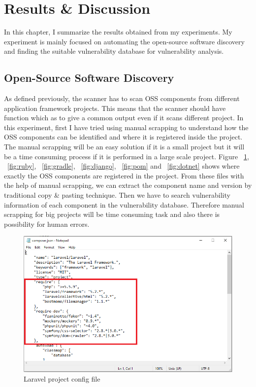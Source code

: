 %
\section{Results \& Discussion}\label{sec:Results & Discussion}
%
In this chapter, I summarize the results obtained from my experiments. My experiment is mainly focused on automating the open-source software discovery and finding the suitable vulnerability database for vulnerability analysis.

\subsection{Open-Source Software Discovery}
As defined previously, the scanner has to scan \acs{OSS} components from different application framework projects. This means that the scanner should have function which as to give a common output even if it scans different project. In this experiment, first I have tried using manual scrapping to understand how the \acs{OSS} components can be identified and where it is registered inside the project. The manual scrapping will be an easy solution if it is a small project but it will be a time consuming process if it is performed in a large scale project. Figure ~\ref{fig:laravel}, ~\ref{fig:ruby}, ~\ref{fig:gradle}, ~\ref{fig:django}, ~\ref{fig:pom} and ~\ref{fig:dotnet} shows where exactly the OSS components are registered in the project. From these files with the help of manual scrapping, we can extract the component name and version by traditional copy \& pasting technique. Then we have to search vulnerability information of each component in the vulnerability database. Therefore manual scrapping for big projects will be time consuming task and also there is possibility for human errors.
\begin{figure}[h!]
	\includegraphics[width=15cm]{includes/laravel.PNG}
	\centering
	\caption{Laravel project config file}
	\label{fig:laravel}
\end{figure}
